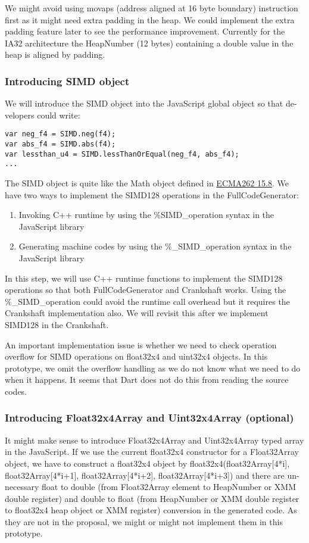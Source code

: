 \documentclass[12pt]{article} %
\begin{document}
We might avoid using movaps (address aligned at 16 byte boundary) instruction
first as it might need extra padding in the heap. We could implement the
extra padding feature later to see the performance improvement.  Currently for
the IA32 architecture the HeapNumber (12 bytes) containing a double value in
the heap is aligned by padding.

\subsubsection{Introducing SIMD object}
We will introduce the SIMD object into the JavaScript global object so that de- velopers could write:


\begin{lstlisting}
var neg_f4 = SIMD.neg(f4);
var abs_f4 = SIMD.abs(f4);
var lessthan_u4 = SIMD.lessThanOrEqual(neg_f4, abs_f4);
...
\end{lstlisting}

The SIMD object is quite like the Math object defined in
\href{http://www.ecma-international.org/ecma-262/5.1/\#sec-15.8}{ECMA262 15.8}.
We have two ways to implement the SIMD128 operations in the FullCodeGenerator:
\begin{enumerate}
  \item Invoking C++ runtime by using the \%SIMD\_operation syntax in the JavaScript library
  \item Generating machine codes by using the \%\_SIMD\_operation syntax in the JavaScript library
\end{enumerate}

In this step, we will use C++ runtime functions to implement the SIMD128
operations so that both FullCodeGenerator and Crankshaft works. Using the
\%\_SIMD\_operation could avoid the runtime call overhead but it requires the
Crankshaft implementation also. We will revisit this after we implement SIMD128
in the Crankshaft.

An important implementation issue is whether we need to check operation
overflow for SIMD operations on float32x4 and uint32x4 objects. In this
prototype, we omit the overflow handling as we do not know what we need to do
when it happens. It seems that Dart does not do this from reading the
source codes.

\subsubsection{Introducing Float32x4Array and Uint32x4Array (optional)}
It might make sense to introduce Float32x4Array and Uint32x4Array typed array
in the JavaScript. If we use the current float32x4 constructor for a
Float32Array object, we have to construct a float32x4 object by
float32x4(float32Array[4*i], float32Array[4*i+1], float32Array[4*i+2],
float32Array[4*i+3]) and there are un-necessary float to double (from
Float32Array element to HeapNumber or XMM double register) and double to float
(from HeapNumber or XMM double register to float32x4 heap object or XMM
register) conversion in the generated code. As they are not in the proposal, we
might or might not implement them in this prototype.
\end{document}
